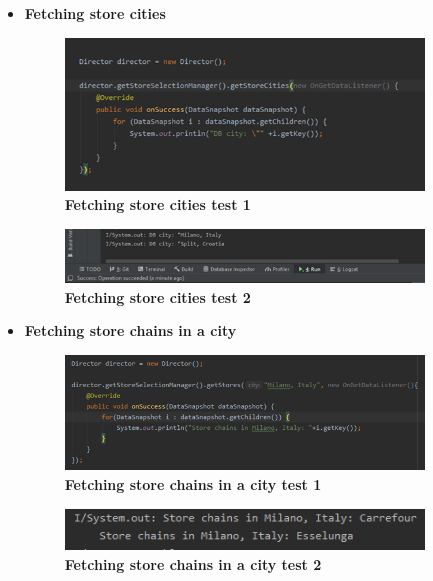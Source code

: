 \begin{itemize}
\item \textbf{Fetching store cities}
\begin{figure}[H]
\centering
\includegraphics[width=0.9\textwidth]{Images/TestingPics/StoreCities1}
\caption{\label{fig:test1}\textbf{Fetching store cities test 1}}
\end{figure}
\begin{figure}[H]
\centering
\includegraphics[width=0.9\textwidth]{Images/TestingPics/StoreCities2}
\caption{\label{fig:test2}\textbf{Fetching store cities test 2}}
\end{figure}
\item \textbf{Fetching store chains in a city}
\begin{figure}[H]
\centering
\includegraphics[width=0.9\textwidth]{Images/TestingPics/StoreChains1}
\caption{\label{fig:test3}\textbf{Fetching store chains in a city test 1}}
\end{figure}
\begin{figure}[H]
\centering
\includegraphics[width=0.9\textwidth]{Images/TestingPics/StoreChains2}
\caption{\label{fig:test4}\textbf{Fetching store chains in a city test 2}}
\end{figure}

\end{itemize}
